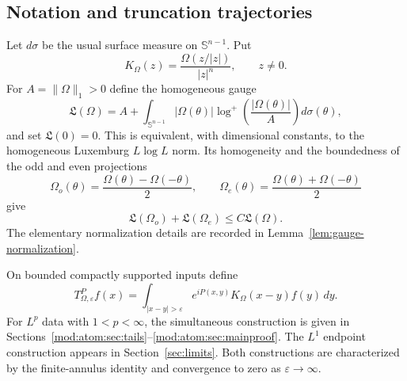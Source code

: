 \documentclass[11pt]{article}
\numberwithin{equation}{section}
\theoremstyle{remark}
\theoremstyle{definition}
\newcommand{\Sph}{\mathbb S}
\newcommand{\norm}[1]{\lVert #1\rVert}
\begin{document}
\subsection{Notation and truncation trajectories}\label{intro:notation}
Let $d\sigma$ be the usual surface measure on $\Sph^{n-1}$.  Put
\[
K_\Omega(z)=\frac{\Omega(z/|z|)}{|z|^n},\qquad z\ne0.
\]
For $A=\norm\Omega_1>0$ define the homogeneous gauge
\begin{equation}\label{eq:gauge}
 \mathfrak L(\Omega)
 =A+\int_{\Sph^{n-1}}|\Omega(\theta)|
 \log^+\!\left(\frac{|\Omega(\theta)|}{A}\right)d\sigma(\theta),
\end{equation}
and set $\mathfrak L(0)=0$.  This is equivalent, with dimensional constants,
to the homogeneous Luxemburg $L\log L$ norm.  Its homogeneity and the
boundedness of the odd and even projections
\[
 \Omega_o(\theta)=\frac{\Omega(\theta)-\Omega(-\theta)}2,
 \qquad
 \Omega_e(\theta)=\frac{\Omega(\theta)+\Omega(-\theta)}2
\]
give
\begin{equation}\label{eq:gauge-parity}
 \mathfrak L(\Omega_o)+\mathfrak L(\Omega_e)
 \le C\mathfrak L(\Omega).
\end{equation}
The elementary normalization details are recorded in
Lemma~\ref{lem:gauge-normalization}.

On bounded compactly supported inputs define
\[
 T^P_{\Omega,\varepsilon}f(x)
 =\int_{|x-y|>\varepsilon}e^{iP(x,y)}K_\Omega(x-y)f(y)\,dy.
\]
For $L^p$ data with $1<p<\infty$, the simultaneous construction is given
in Sections~\ref{mod:atom:sec:tails}--\ref{mod:atom:sec:mainproof}.
The $L^1$ endpoint construction appears in Section~\ref{sec:limits}.
Both constructions are characterized by the finite-annulus identity and
convergence to zero as $\varepsilon\to\infty$.
\end{document}

